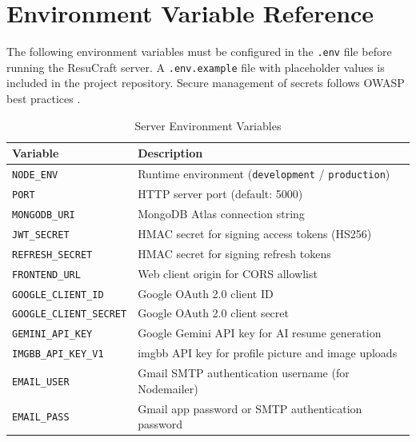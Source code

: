 \documentclass[12pt, a4paper, oneside]{report}
\begin{document}
\chapter{Environment Variable Reference}

The following environment variables must be configured in the \texttt{.env} file before running the ResuCraft server. A \texttt{.env.example} file with placeholder values is included in the project repository. Secure management of secrets follows OWASP best practices \cite{owasp2021}.

\begin{table}[H]
\centering
\caption{Server Environment Variables}
\label{tab:env_vars}
\renewcommand{\arraystretch}{1.3}
\begin{tabularx}{\textwidth}{|p{5.5cm}|X|}
\hline
\textbf{Variable} & \textbf{Description} \\
\hline
\texttt{NODE\_ENV} & Runtime environment (\texttt{development} / \texttt{production}) \\
\texttt{PORT} & HTTP server port (default: 5000) \\
\texttt{MONGODB\_URI} & MongoDB Atlas connection string \\
\texttt{JWT\_SECRET} & HMAC secret for signing access tokens \cite{jwt2015} (HS256) \\
\texttt{REFRESH\_SECRET} & HMAC secret for signing refresh tokens \\
\texttt{FRONTEND\_URL} & Web client origin for CORS allowlist \\
\texttt{GOOGLE\_CLIENT\_ID} & Google OAuth 2.0 \cite{oauth2012} client ID \\
\texttt{GOOGLE\_CLIENT\_SECRET} & Google OAuth 2.0 client secret \\
\texttt{GEMINI\_API\_KEY} & Google Gemini API \cite{gemini2023} key for AI resume generation \\
\texttt{IMGBB\_API\_KEY\_V1} & imgbb API \cite{imgbb2024} key for profile picture and image uploads \\
\texttt{EMAIL\_USER} & Gmail SMTP authentication username (for Nodemailer) \\
\texttt{EMAIL\_PASS} & Gmail app password or SMTP authentication password \\
\hline
\end{tabularx}
\end{table}
\end{document}
